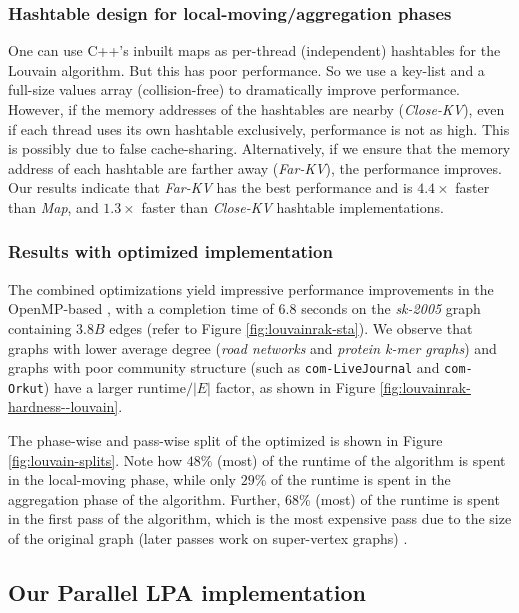 \subsubsection{Hashtable design for local-moving/aggregation phases}

One can use C++'s inbuilt maps as per-thread (independent) hashtables for the Louvain algorithm. But this has poor performance. So we use a key-list and a full-size values array (collision-free) to dramatically improve performance. However, if the memory addresses of the hashtables are nearby (\textit{Close-KV}), even if each thread uses its own hashtable exclusively, performance is not as high. This is possibly due to false cache-sharing. Alternatively, if we ensure that the memory address of each hashtable are farther away (\textit{Far-KV}), the performance improves. Our results indicate that \textit{Far-KV} has the best performance and is $4.4\times$ faster than \textit{Map}, and $1.3\times$ faster than \textit{Close-KV} hashtable implementations.


\subsubsection{Results with optimized implementation}

The combined optimizations yield impressive performance improvements in the OpenMP-based \StaLou{}, with a completion time of $6.8$ seconds on the \textit{sk-2005} graph containing $3.8 B$ edges (refer to Figure \ref{fig:louvainrak-sta}). We observe that graphs with lower average degree (\textit{road networks} and \textit{protein k-mer graphs}) and graphs with poor community structure (such as \verb|com-LiveJournal| and \verb|com-Orkut|) have a larger $\text{runtime}/|E|$ factor, as shown in Figure \ref{fig:louvainrak-hardness--louvain}.

The phase-wise and pass-wise split of the optimized \StaLou{} is shown in Figure \ref{fig:louvain-splits}. Note how $48\%$ (most) of the runtime of the algorithm is spent in the local-moving phase, while only $29\%$ of the runtime is spent in the aggregation phase of the algorithm. Further, $68\%$ (most) of the runtime is spent in the first pass of the algorithm, which is the most expensive pass due to the size of the original graph (later passes work on super-vertex graphs) \cite{com-wickramaarachchi14}.




\subsection{Our Parallel LPA implementation}
\label{sec:rak}

